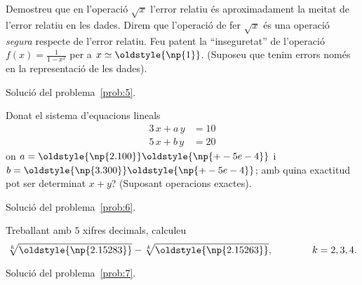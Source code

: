 \documentclass[a4paper,twoside,12pt]{exam}
\newcommand{\osnp}[1]{\oldstyle{\np{#1}}}
\begin{document}
\begin{questions}
\question\label{prob:5}
Demostreu que en l'operació $\sqrt{x}$ l'error relatiu és aproximadament la
meitat de l'error relatiu en les dades. Direm que l'operació de fer $\sqrt{x}$
és una operació \emph{segura} respecte de l'error relatiu. Feu patent la
``inseguretat'' de l'operació $f(x) = \frac{1}{1-x^{2}}$ per a $x\simeq\osnp{1}$.
(Suposeu que tenim errors només en la representació de les dades). 
\begin{solution}
	Solució del problema~\ref{prob:5}.
\end{solution}

\question\label{prob:6}
Donat el sistema d'equacions lineals
\begin{align*}
	3\,x + a\,y &= 10\\
	5\,x + b\,y &= 20
\end{align*}
on $a = \osnp{2.100}\osnp{+-5e-4}$ i $b = \osnp{3.300}\osnp{+-5e-4}$; amb quina
exactitud pot ser determinat $x+y$? (Suposant operacions exactes).
\begin{solution}
	Solució del problema~\ref{prob:6}.
\end{solution}

\question\label{prob:7}
Treballant amb $5$ xifres decimals, calculeu
\begin{displaymath}
	\sqrt[k]{\osnp{2.15283}} - \sqrt[k]{\osnp{2.15263}},\qquad\qquad
	k=2,3,4.
\end{displaymath}
\begin{solution}
	Solució del problema~\ref{prob:7}.
\end{solution}


\end{questions}
\end{document}
